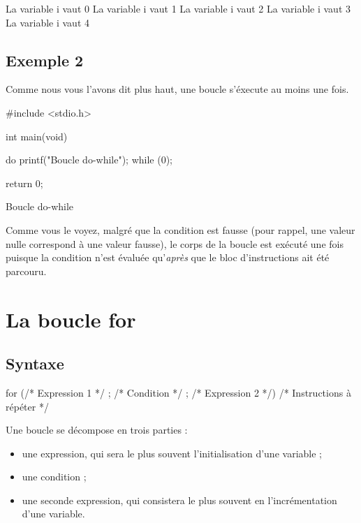 \begin{C}
La variable i vaut 0
La variable i vaut 1
La variable i vaut 2
La variable i vaut 3
La variable i vaut 4
\end{C}

\subsection{Exemple 2}
\label{exemple-7}

Comme nous vous l'avons dit plus haut, une boucle 
s'éxecute au moins une fois.

\begin{C}
#include <stdio.h>


int main(void)
{    
    do
        printf("Boucle do-while\n");
    while (0);

    return 0;
}
\end{C}

\begin{C}
Boucle do-while
\end{C}

Comme vous le voyez, malgré que la condition est fausse (pour rappel,
une valeur nulle correspond à une valeur fausse), le corps de la boucle
est exécuté une fois puisque la condition n'est évaluée qu'\emph{après}
que le bloc d'instructions ait été parcouru.

\section{La boucle for}
\label{la-boucle-for}


\subsection{Syntaxe}
\label{syntaxe-3}

\begin{C}
for (/* Expression 1 */ ; /* Condition */ ; /* Expression 2 */)
{
    /* Instructions à répéter */
}
\end{C}

Une boucle  se décompose en trois parties :

\begin{itemize}
\item
  une expression, qui sera le plus souvent l'initialisation d'une
  variable ;
\item
  une condition ;
\item
  une seconde expression, qui consistera le plus souvent en
  l'incrémentation d'une variable.
\end{itemize}

